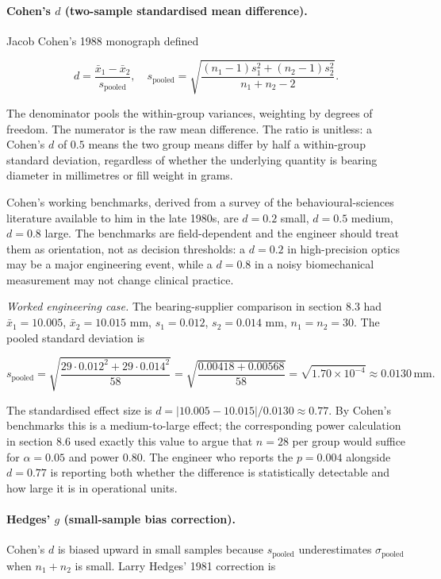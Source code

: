 \paragraph{Cohen's $d$ (two-sample standardised mean difference).}
Jacob Cohen's 1988 monograph \cite{text:ch08t3b-cohen-1988} defined

\[
d = \frac{\bar{x}_{1} - \bar{x}_{2}}{s_{\text{pooled}}},
\quad
s_{\text{pooled}} = \sqrt{\frac{(n_{1} - 1) s_{1}^{2} + (n_{2} - 1)
s_{2}^{2}}{n_{1} + n_{2} - 2}}.
\]

The denominator pools the within-group variances, weighting by
degrees of freedom. The numerator is the raw mean difference. The
ratio is unitless: a Cohen's $d$ of $0.5$ means the two group means
differ by half a within-group standard deviation, regardless of
whether the underlying quantity is bearing diameter in
millimetres or fill weight in grams.

Cohen's working benchmarks, derived from a survey of the
behavioural-sciences literature available to him in the late 1980s,
are $d = 0.2$ small, $d = 0.5$ medium, $d = 0.8$ large. The
benchmarks are field-dependent and the engineer should treat them
as orientation, not as decision thresholds: a $d = 0.2$ in
high-precision optics may be a major engineering event, while a
$d = 0.8$ in a noisy biomechanical measurement may not change
clinical practice.

\emph{Worked engineering case.} The bearing-supplier comparison in
section 8.3 had $\bar{x}_{1} = 10.005$, $\bar{x}_{2} = 10.015$
$\si{\milli\meter}$, $s_{1} = 0.012$, $s_{2} = 0.014$
$\si{\milli\meter}$, $n_{1} = n_{2} = 30$. The pooled standard
deviation is

\[
s_{\text{pooled}} = \sqrt{\frac{29 \cdot 0.012^{2} + 29 \cdot
0.014^{2}}{58}} = \sqrt{\frac{0.00418 + 0.00568}{58}}
= \sqrt{1.70 \times 10^{-4}}
\approx 0.0130 \,\si{\milli\meter}.
\]

\noindent
The standardised effect size is $d = |10.005 - 10.015|/0.0130
\approx 0.77$. By Cohen's benchmarks this is a medium-to-large
effect; the corresponding power calculation in section 8.6 used
exactly this value to argue that $n = 28$ per group would suffice
for $\alpha = 0.05$ and power $0.80$. The engineer who reports the
$p = 0.004$ alongside $d = 0.77$ is reporting both whether the
difference is statistically detectable and how large it is in
operational units.

\paragraph{Hedges' $g$ (small-sample bias correction).}
Cohen's $d$ is biased upward in small samples because $s_{\text{
pooled}}$ underestimates $\sigma_{\text{pooled}}$ when $n_{1} +
n_{2}$ is small. Larry Hedges' 1981 correction
\cite{paper:ch08t3b-hedges-1981} is

